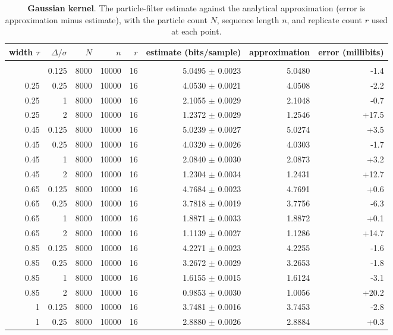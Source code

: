 {\small
\begin{longtable}[]{@{}rrrrrrrr@{}}
\toprule\noalign{}
width $\tau$ & $\Delta/\sigma$ & $N$ & $n$ & $r$ & estimate (bits/sample) & approximation & error (millibits) \\
\midrule\noalign{}
\endhead
\bottomrule\noalign{}
\caption{\textbf{Gaussian kernel}. The particle-filter estimate against the analytical approximation (error is approximation minus estimate), with the particle count $N$, sequence length $n$, and replicate count $r$ used at each point.}\label{tab:family3}\\
\endlastfoot
0.25 & 0.125 & 8000 & 10000 & 16 & 5.0495 $\pm$ 0.0023 & 5.0480 & -1.4 \\
0.25 & 0.25 & 8000 & 10000 & 16 & 4.0530 $\pm$ 0.0021 & 4.0508 & -2.2 \\
0.25 & 1 & 8000 & 10000 & 16 & 2.1055 $\pm$ 0.0029 & 2.1048 & -0.7 \\
0.25 & 2 & 8000 & 10000 & 16 & 1.2372 $\pm$ 0.0029 & 1.2546 & +17.5 \\
0.45 & 0.125 & 8000 & 10000 & 16 & 5.0239 $\pm$ 0.0027 & 5.0274 & +3.5 \\
0.45 & 0.25 & 8000 & 10000 & 16 & 4.0320 $\pm$ 0.0026 & 4.0303 & -1.7 \\
0.45 & 1 & 8000 & 10000 & 16 & 2.0840 $\pm$ 0.0030 & 2.0873 & +3.2 \\
0.45 & 2 & 8000 & 10000 & 16 & 1.2304 $\pm$ 0.0034 & 1.2431 & +12.7 \\
0.65 & 0.125 & 8000 & 10000 & 16 & 4.7684 $\pm$ 0.0023 & 4.7691 & +0.6 \\
0.65 & 0.25 & 8000 & 10000 & 16 & 3.7818 $\pm$ 0.0019 & 3.7756 & -6.3 \\
0.65 & 1 & 8000 & 10000 & 16 & 1.8871 $\pm$ 0.0033 & 1.8872 & +0.1 \\
0.65 & 2 & 8000 & 10000 & 16 & 1.1139 $\pm$ 0.0027 & 1.1286 & +14.7 \\
0.85 & 0.125 & 8000 & 10000 & 16 & 4.2271 $\pm$ 0.0023 & 4.2255 & -1.6 \\
0.85 & 0.25 & 8000 & 10000 & 16 & 3.2672 $\pm$ 0.0029 & 3.2653 & -1.8 \\
0.85 & 1 & 8000 & 10000 & 16 & 1.6155 $\pm$ 0.0015 & 1.6124 & -3.1 \\
0.85 & 2 & 8000 & 10000 & 16 & 0.9853 $\pm$ 0.0030 & 1.0056 & +20.2 \\
1 & 0.125 & 8000 & 10000 & 16 & 3.7481 $\pm$ 0.0016 & 3.7453 & -2.8 \\
1 & 0.25 & 8000 & 10000 & 16 & 2.8880 $\pm$ 0.0026 & 2.8884 & +0.3 \\

\end{longtable}}
